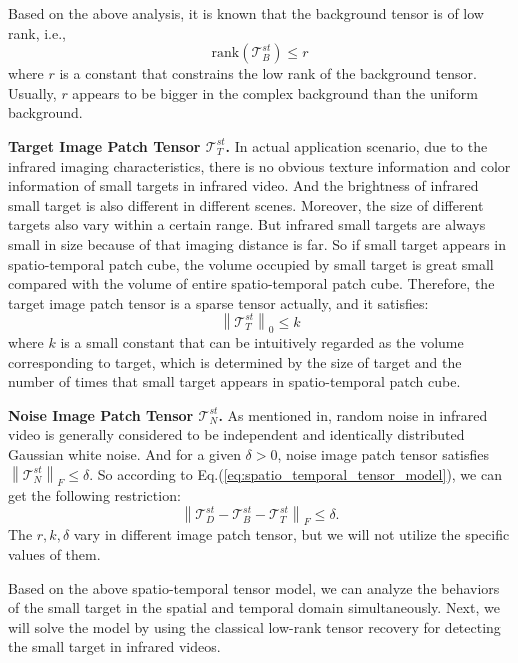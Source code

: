 \documentclass[journal]{IEEEtran}
\begin{document}
Based on the above analysis, it is known that the background  tensor is of low rank, i.e.,
\begin{equation}
  \mbox{rank}(\bm{\mathcal T}_B^{st}) \leq r
\end{equation}
where $r$ is a  constant that constrains the low rank of the background tensor. Usually, $r$ appears to be bigger in the complex background than the uniform background.


\textbf{Target Image Patch Tensor $\mathbf{\mathcal T}_T^{st}$.}\quad
In actual application scenario, due to the infrared imaging characteristics, there is no obvious texture information and color information of small targets in infrared video. And the brightness of infrared small target is also different in different scenes. Moreover, the size of different targets also vary within a certain range. But infrared small targets are always small in size because of that imaging distance is far. So if small target appears in spatio-temporal patch cube, the volume occupied by small target is great small compared with the volume of entire spatio-temporal patch cube. Therefore, the target image patch tensor is a sparse tensor actually, and it satisfies:
\begin{equation}
  \left \| \bm{\mathcal T}_T^{st} \right \|_0 \leq k
\end{equation}
where $k$ is a small constant that can be intuitively regarded as the volume corresponding to target, which is determined by the size of target and the number of times that small target appears in spatio-temporal patch cube.

\textbf{Noise Image Patch Tensor $\mathbf{\mathcal T}_N^{st}$.}\quad
As mentioned in\cite{gao2013infrared}, random noise in infrared video is generally considered to be independent and identically distributed Gaussian white noise. And for a given $\delta>0$, noise image patch tensor satisfies $\left \| \bm{\mathcal T}_N^{st} \right \|_F \leq \delta$. So according to Eq.(\ref{eq:spatio_temporal_tensor_model}), we can get the following restriction:
\begin{equation}
  \left \| \bm{\mathcal T}_D^{st}-\bm{\mathcal T}_B^{st}-\bm{\mathcal T}_T^{st} \right \|_F \leq \delta.
\end{equation}
The $r,k,\delta$ vary in different image patch tensor, but we will not utilize the specific values of them.

Based on the above spatio-temporal tensor model, we can analyze the behaviors of the small target in the spatial and temporal domain simultaneously.
Next, we will solve the model by using the classical low-rank tensor recovery for detecting the small target in infrared videos.
\end{document}
